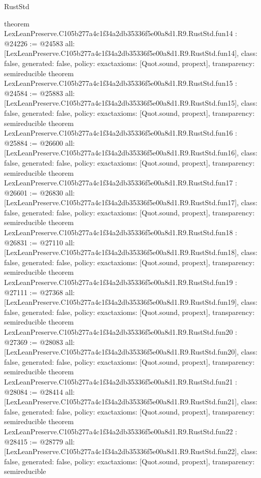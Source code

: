\begin{lexlean}{RustStd}
\begin{coremodule}
{}
theorem LexLeanPreserve.C105b277a4c1f34a2db35336f5e00a8d1.R9.RustStd.fun14 : @24226 := @24583 {
  all: [LexLeanPreserve.C105b277a4c1f34a2db35336f5e00a8d1.R9.RustStd.fun14],
  class: false,
  generated: false,
  policy: exact{axioms: [Quot.sound, propext]},
  transparency: semireducible
}
theorem LexLeanPreserve.C105b277a4c1f34a2db35336f5e00a8d1.R9.RustStd.fun15 : @24584 := @25883 {
  all: [LexLeanPreserve.C105b277a4c1f34a2db35336f5e00a8d1.R9.RustStd.fun15],
  class: false,
  generated: false,
  policy: exact{axioms: [Quot.sound, propext]},
  transparency: semireducible
}
theorem LexLeanPreserve.C105b277a4c1f34a2db35336f5e00a8d1.R9.RustStd.fun16 : @25884 := @26600 {
  all: [LexLeanPreserve.C105b277a4c1f34a2db35336f5e00a8d1.R9.RustStd.fun16],
  class: false,
  generated: false,
  policy: exact{axioms: [Quot.sound, propext]},
  transparency: semireducible
}
theorem LexLeanPreserve.C105b277a4c1f34a2db35336f5e00a8d1.R9.RustStd.fun17 : @26601 := @26830 {
  all: [LexLeanPreserve.C105b277a4c1f34a2db35336f5e00a8d1.R9.RustStd.fun17],
  class: false,
  generated: false,
  policy: exact{axioms: [Quot.sound, propext]},
  transparency: semireducible
}
theorem LexLeanPreserve.C105b277a4c1f34a2db35336f5e00a8d1.R9.RustStd.fun18 : @26831 := @27110 {
  all: [LexLeanPreserve.C105b277a4c1f34a2db35336f5e00a8d1.R9.RustStd.fun18],
  class: false,
  generated: false,
  policy: exact{axioms: [Quot.sound, propext]},
  transparency: semireducible
}
theorem LexLeanPreserve.C105b277a4c1f34a2db35336f5e00a8d1.R9.RustStd.fun19 : @27111 := @27368 {
  all: [LexLeanPreserve.C105b277a4c1f34a2db35336f5e00a8d1.R9.RustStd.fun19],
  class: false,
  generated: false,
  policy: exact{axioms: [Quot.sound, propext]},
  transparency: semireducible
}
theorem LexLeanPreserve.C105b277a4c1f34a2db35336f5e00a8d1.R9.RustStd.fun20 : @27369 := @28083 {
  all: [LexLeanPreserve.C105b277a4c1f34a2db35336f5e00a8d1.R9.RustStd.fun20],
  class: false,
  generated: false,
  policy: exact{axioms: [Quot.sound, propext]},
  transparency: semireducible
}
theorem LexLeanPreserve.C105b277a4c1f34a2db35336f5e00a8d1.R9.RustStd.fun21 : @28084 := @28414 {
  all: [LexLeanPreserve.C105b277a4c1f34a2db35336f5e00a8d1.R9.RustStd.fun21],
  class: false,
  generated: false,
  policy: exact{axioms: [Quot.sound, propext]},
  transparency: semireducible
}
theorem LexLeanPreserve.C105b277a4c1f34a2db35336f5e00a8d1.R9.RustStd.fun22 : @28415 := @28779 {
  all: [LexLeanPreserve.C105b277a4c1f34a2db35336f5e00a8d1.R9.RustStd.fun22],
  class: false,
  generated: false,
  policy: exact{axioms: [Quot.sound, propext]},
  transparency: semireducible
}
\end{coremodule}
\end{lexlean}
